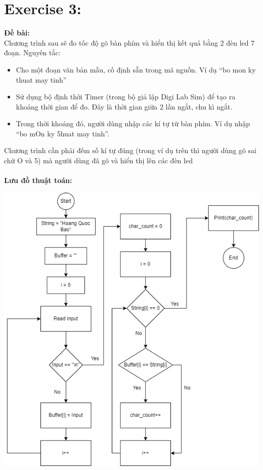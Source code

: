 \documentclass[12pt,a4paper,oneside]{article}
\begin{document}
\section*{Exercise 3:}
\textbf{Đề bài: \\}
Chương trình sau sẽ đo tốc độ gõ bàn phím và hiển thị kết quả bằng 2 đèn led 7 đoạn. Nguyên tắc:
\begin{itemize}
\item Cho một đoạn văn bản mẫu, cố định sẵn trong mã nguồn. Ví dụ “bo mon ky thuat may tinh”
\item Sử dụng bộ định thời Timer (trong bộ giả lập Digi Lab Sim) để tạo ra khoảng thời gian để đo. Đây là thời 
gian giữa 2 lần ngắt, chu kì ngắt.
\item Trong thời khoảng đó, người dùng nhập các kí tự từ bàn phím. Ví dụ nhập “bo mOn ky 5huat may tinh”.
\end{itemize}
Chương trình cần phải đếm số kí tự đúng (trong ví dụ trên thì người dùng gõ sai chữ O và 5) mà người dùng đã gõ và hiển thị lên các đèn led\\\\
\textbf{Lưu đồ thuật toán:}
\begin{center}
\includegraphics[scale=0.7]{image/flowchartb3}
\end{center}
\end{document}

